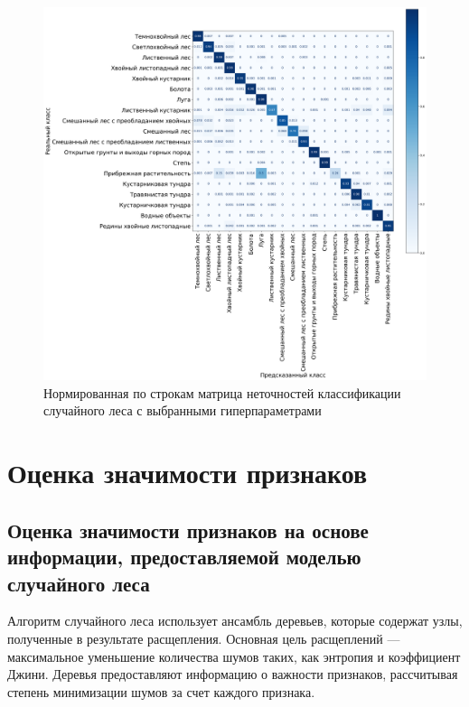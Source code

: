 \documentclass[14pt, a4paper, oneside]{extarticle}
\begin{document}
\begin{figure}[H]
    \caption{Нормированная по строкам матрица неточностей классификации случайного леса с выбранными гиперпараметрами}
    \centering
    \includegraphics[scale=0.33]{confusion-matrix-4}
\end{figure}
\newpage

\section{Оценка значимости признаков}
\subsection{Оценка значимости признаков на основе информации, предоставляемой моделью случайного леса}
Алгоритм случайного леса использует ансамбль деревьев, которые содержат узлы, полученные в результате расщепления. Основная цель расщеплений --- максимальное уменьшение количества шумов таких, как энтропия и коэффициент Джини. Деревья предоставляют информацию о важности признаков, рассчитывая степень минимизации шумов за счет каждого признака.
\end{document}
